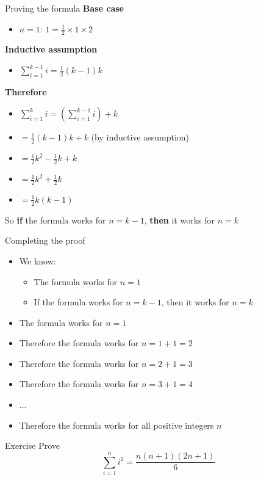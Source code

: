 \begin{frame}{Proving the formula}
\pause\textbf{Base case}
\begin{itemize}
	\pause\item $n=1$: $1 = \frac12 \times 1 \times 2$
\end{itemize}
\pause\textbf{Inductive assumption}
\begin{itemize}
	\pause\item $\sum_{i=1}^{k-1} i = \frac12 (k-1) k$
\end{itemize}
\pause\textbf{Therefore}
\begin{itemize}
	\pause\item $\sum_{i=1}^k i = \left( \sum_{i=1}^{k-1} i \right) + k$
	\pause\item $= \frac12 (k-1) k + k$ (by inductive assumption)
	\pause\item $= \frac12 k^2 - \frac12 k + k$
	\pause\item $= \frac12 k^2 + \frac12 k$
	\pause\item $= \frac12 k (k-1)$
\end{itemize}
\pause So \textbf{if} the formula works for $n=k-1$, \textbf{then} it works for $n=k$
\end{frame}

\begin{frame}{Completing the proof}
\begin{itemize}
	\pause\item We know:
		\begin{itemize}
			\pause\item The formula works for $n=1$
			\pause\item If the formula works for $n=k-1$, then it works for $n=k$
		\end{itemize}
	\pause\item The formula works for $n=1$
	\pause\item Therefore the formula works for $n=1+1=2$
	\pause\item Therefore the formula works for $n=2+1=3$
	\pause\item Therefore the formula works for $n=3+1=4$
	\pause\item ...
	\pause\item Therefore the formula works for all positive integers $n$
\end{itemize}
\end{frame}

\begin{frame}{Exercise}
Prove
$$ \sum_{i=1}^n i^2 = \frac{n(n+1)(2n+1)}{6} $$
\end{frame}

